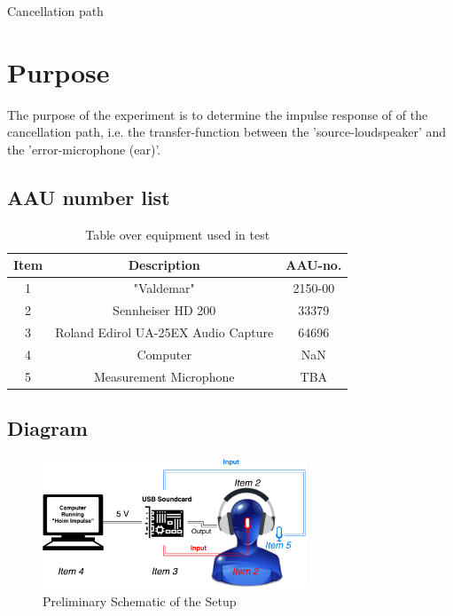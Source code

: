 \documentclass[12pt,a4paper,openright]{article}
\newcommand{\ra}[1]{\renewcommand{\arraystretch}{#1}}
\begin{document}
\begin{Huge}
\begin{center}
Cancellation path
\end{center}
\end{Huge}

\section{Purpose}
The purpose of the experiment is to determine the impulse response of of the cancellation path, i.e. the transfer-function between the 'source-loudspeaker' and the 'error-microphone (ear)'.
		
\subsection{AAU number list}
\begin{table}[h]
	\centering
	\ra{1.3}
	\begin{tabular}{ c c c } \toprule
		{Item} & {Description} & {AAU-no}. \\ \bottomrule 
		1      &  "Valdemar"							& 2150-00	\\
		2      &  Sennheiser HD 200						& 33379		\\
		3      &  Roland Edirol UA-25EX Audio Capture	& 64696		\\
		4      &  Computer								& NaN		\\  
		5      &  Measurement Microphone				& TBA		\\ \bottomrule 
	\end{tabular}
	\caption{Table over equipment used in test}
	\label{tab:UsedEquipmentListning1}
\end{table}

\subsection{Diagram}
\begin{figure}[H]
	\centering
	\includegraphics[width=0.7\textwidth]{Schem1.pdf}
	\caption{Preliminary Schematic of the Setup}
	\label{Schematic}
\end{figure}
\end{document}
